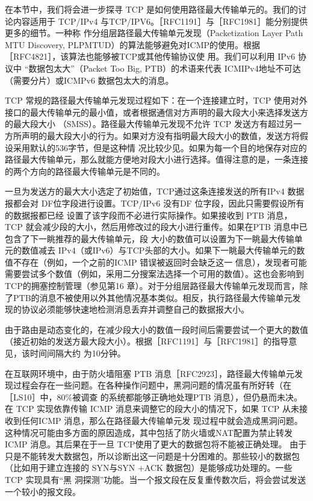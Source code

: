 在本节中，我们将会进一步探寻 TCP 是如何使用路径最大传输单元的。我们的讨论内容适用于 TCP/IPv4 与TCP/IPV6。［RFC1191］与［RFC1981］能分别提供更多的细节。一种称
作分组层路径最大传输单元发现（Packetization Layer Path MTU Discovery, PLPMTUD）的算法能够避免对ICMP的使用。根据［RFC4821］，该算法也能够被TCP或其他传输协议使
用。我们可以利用 IPv6 协议中 “数据包太大”（Packet Too Big, PTB）的术语来代表 ICMIPv4地址不可达（需要分片）或ICMPv6 数据包太大的消息。

TCP 常规的路径最大传输单元发现过程如下：在一个连接建立时，TCP 使用对外接口的最大传输单元的最小值，或者根据通信对方声明的最大段大小来选择发送方的最大段大小
（SMSS）。路径最大传输单元发现不允许 TCP 发送方有超过另一方所声明的最大段大小的行为。如果对方没有指明最大段大小的数值，发送方将假设采用默认的536字节，但是这种情
况比较少见。如果为每一个目的地保存对应的路径最大传输单元，那么就能方便地对段大小进行选择。值得注意的是，一条连接的两个方向的路径最大传输单元是不同的。

一旦为发送方的最大大小选定了初始值，TCP通过这条连接发送的所有IPv4 数据报都会对 DF位字段进行设置。TCP/IPv6 没有DF 位字段，因此只需要假设所有的数据报都已经
设置了该字段而不必进行实际操作。如果接收到 PTB 消息，TCP 就会减少段的大小，然后用修改过的段大小进行重传。如果在PTB 消息中已包含了下一眺推荐的最大传输单元，段
大小的数值可以设置为下一眺最大传输单元的数值减去 IPv4（或IPv6）与TCP头部的大小。如果下一眺最大传输单元的数值不存在（例如，一个之前的ICMP 错误被返回时会缺乏这一
信息），发现者可能需要尝试多个数值（例如，采用二分搜案法选择一个可用的数值）。这也会影响到 TCP的拥塞控制管理（参见第16 章）。对于分组层路径最大传输单元发现而言，除
了PTB的消息不被使用以外其他情况基本类似。相反，执行路径最大传输单元发现的协议必须能够快速地检测消息丢弃并调整自己的数据报大小。

由于路由是动态变化的，在减少段大小的数值一段时间后需要尝试一个更大的数值（接近初始的发送方最大段大小）。根据［RFC1191］与［RFC1981］的指导意见，该时间间隔大约
为10分钟。

在互联网环境中，由于防火墙阻塞 PTB 消息［RFC2923］，路径最大传输单元发现过程会存在一些问题。在各种操作问题中，黑洞问题的情况虽有所好转（在［LS10］中，80\%被调查
的系统都能够正确地处理PTB 消息），但仍悬而未决。在 TCP 实现依靠传输 ICMP 消息来调整它的段大小的情况下，如果 TCP 从未接收到任何ICMP 消息，那么在路径最大传输单元发
现过程中就会造成黑洞问题。这种情况可能由多方面的原因造成，其中包括了防火墙或NAT配置为禁止转发ICMP 消息。其后果在于一旦 TCP使用了更大的数据包将不能被正确处理。
由于只是不能转发大数据包，所以诊断出这一问题是十分困难的。那些较小的数据包（比如用于建立连接的 SYN与SYN +ACK 数据包）是能够成功处理的。一些TCP 实现具有“黑
洞探测”功能。当一个报文段在反复重传数次后，将会尝试发送一个较小的报文段。
